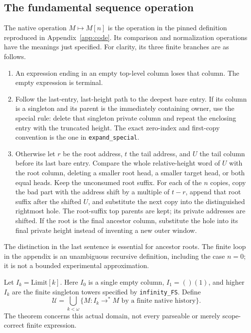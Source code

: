 \subsection{The fundamental sequence operation}
The native operation $M\mapsto M[n]$ is the operation in the pinned
definition reproduced in Appendix~\ref{app:code}. Its comparison and
normalization operations have the meanings just specified. For clarity,
its three finite branches are as follows.
\begin{enumerate}
\item An expression ending in an empty top-level column loses that
      column. The empty expression is terminal.
\item Follow the last-entry, last-height path to the deepest bare entry.
      If its column is a singleton and its parent is the immediately
      containing owner, use the special rule: delete that singleton
      private column and repeat the enclosing entry with the truncated
      height. The exact zero-index and first-copy convention is the
      one in \texttt{expand\_special}.
\item Otherwise let $r$ be the root address, $t$ the tail address, and
      $U$ the tail column before its last bare entry. Compare the whole
      relative-height word of $U$ with the root column, deleting a
      smaller root head, a smaller target head, or both equal heads.
      Keep the unconsumed root suffix. For each of the $n$ copies, copy
      the bad part with the address shift by a multiple of $t-r$, append
      that root suffix after the shifted $U$, and substitute the next
      copy into the distinguished rightmost hole. The root-suffix top
      parents are kept; its private addresses are shifted. If the root
      is the final ancestor column, substitute the hole into its final
      private height instead of inventing a new outer window.
\end{enumerate}
The distinction in the last sentence is essential for ancestor roots.
The finite loop in the appendix is an unambiguous recursive definition,
including the case $n=0$; it is not a bounded experimental approximation.

Let $I_k=\mathrm{Limit}[k]$. Here $I_0$ is a single empty column,
$I_1=()(1)$, and higher $I_k$ are the finite singleton towers specified
by \texttt{infinity\_FS}. Define
\[
 \mathscr U=\bigcup_{k<\omega}
 \{M: I_k\longrightarrow^* M\text{ by a finite native history}\}.
\]
The theorem concerns this actual domain, not every parseable or merely
scope-correct finite expression.

